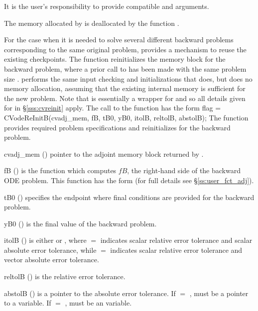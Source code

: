 {
  {\warn}It is the user's responsibility to provide compatible  and
   arguments.

  The memory allocated by  is deallocated by the function 
  .

}
For the case when it is needed to solve several different backward problems 
corresponding to the same original problem, {\cvodes} provides a mechanism 
to reuse the existing checkpoints. The function  reinitializes
the {\cvodes} memory block for the backward problem, where a prior call to
 has been made with the same problem size .
 performs the same input checking and initializations that 
 does, but does no memory allocation, 
assuming that the existing internal memory is sufficient for the new problem. 
Note that  is essentially a wrapper for 
and so all details given for  in \S\ref{sss:cvreinit}
apply.
The call to the  function has the form
{
  flag = CVodeReInitB(cvadj\_mem, fB, tB0, yB0, itolB, reltolB, abstolB);
}
{
  The function  provides required problem specifications 
  and reinitializes {\cvodes} for the backward problem.
}
{
  \begin{args}
  \item[cvadj\_mem] ()
    pointer to the adjoint memory block returned by .
  \item[fB] ()
    is the {\C} function which computes $fB$, the right-hand side of the 
    backward ODE problem. This function has the form 
     (for full details see \S\ref{ss:user_fct_adj}).
  \item[tB0] ()
    specifies the endpoint where final conditions are provided for the 
    backward problem.
  \item[yB0] ()
    is the final value of the backward problem. 
  \item[itolB] () 
    is either  or , where $=$ indicates scalar relative error 
    tolerance and scalar absolute error tolerance, while $=$ indicates scalar
    relative error tolerance and vector absolute error tolerance. 
  \item[reltolB] ()
    is the relative error tolerance.
  \item[abstolB] ()
    is a pointer to the absolute error tolerance. If  $=$ , 
    must be a pointer to a  variable. If  $=$ , 
    must be an  variable.
  \end{args}
}
